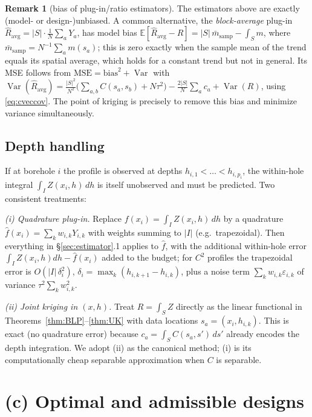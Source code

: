 \documentclass{amsart}
\theoremstyle{definition}
\newtheorem{remark}[theorem]{Remark}
\newcommand{\E}{\mathbb{E}}
\newcommand{\Var}{\operatorname{Var}}
\newcommand{\Rhat}{\widehat R}
\begin{document}
\begin{remark}[bias of plug-in/ratio estimators]
The estimators above are exactly (model- or design-)unbiased. A common
alternative, the \emph{block-average} plug-in
$\Rhat_{\mathrm{avg}}=|S|\cdot\frac1N\sum_a Y_a$, has model bias
$\E[\Rhat_{\mathrm{avg}}-R]=|S|\,\bar m_{\mathrm{samp}}-\int_S m$, where
$\bar m_{\mathrm{samp}}=N^{-1}\sum_a m(s_a)$; this is zero exactly when the
sample mean of the trend equals its spatial average, which holds for a
constant trend but not in general. Its MSE follows from
$\mathrm{MSE}=\text{bias}^2+\Var$ with
$\Var(\Rhat_{\mathrm{avg}})
=\frac{|S|^2}{N^2}\big(\sum_{a,b}C(s_a,s_b)+N\tau^2\big)
-\frac{2|S|}{N}\sum_a c_a+\Var(R)$, using \eqref{eq:cveccov}. The point of
kriging is precisely to remove this bias and minimize variance
simultaneously.
\end{remark}

\subsection{Depth handling}\label{sec:depth}
If at borehole $i$ the profile is observed at depths
$h_{i,1}<\dots<h_{i,p_i}$, the within-hole integral
$\int_I Z(x_i,h)\,dh$ is itself unobserved and must be predicted. Two
consistent treatments:

\emph{(i) Quadrature plug-in.} Replace $f(x_i)=\int_I Z(x_i,h)\,dh$ by a
quadrature $\widehat f(x_i)=\sum_k w_{i,k}Y_{i,k}$ with weights summing to
$|I|$ (e.g.\ trapezoidal). Then everything in \S\ref{sec:estimator}.1
applies to $\widehat f$, with the additional within-hole error
$\int_I Z(x_i,h)dh-\widehat f(x_i)$ added to the budget; for $C^2$ profiles
the trapezoidal error is $O(|I|\,\delta_i^2)$, $\delta_i=\max_k
(h_{i,k+1}-h_{i,k})$, plus a noise term $\sum_k w_{i,k}\varepsilon_{i,k}$
of variance $\tau^2\sum_k w_{i,k}^2$.

\emph{(ii) Joint kriging in $(x,h)$.} Treat $R=\int_S Z$ directly as the
linear functional in Theorems~\ref{thm:BLP}--\ref{thm:UK} with data
locations $s_a=(x_i,h_{i,k})$. This is exact (no quadrature error) because
$c_a=\int_S C(s_a,s')\,ds'$ already encodes the depth integration. We adopt
(ii) as the canonical method; (i) is its computationally cheap separable
approximation when $C$ is separable.

\section{(c) Optimal and admissible designs}\label{sec:designs}
\end{document}
